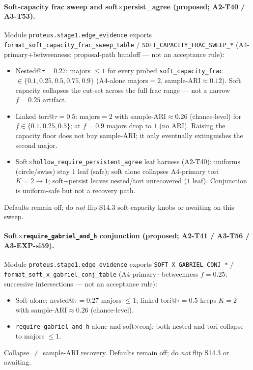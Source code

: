 \documentclass[11pt]{article}
\begin{document}
\paragraph{Soft-capacity frac sweep and soft$\times$persist\_agree (proposed;
A2-T40 / A3-T53).}
Module \texttt{proteus.stage1.edge\_evidence} exports
\texttt{format\_soft\_capacity\_frac\_sweep\_table} /
\texttt{SOFT\_CAPACITY\_FRAC\_SWEEP\_*} (A4-primary$+$betweenness; proposal-path
handoff --- not an acceptance rule):
\begin{itemize}[leftmargin=1.5em]
  \item Nested@$\tau{=}0.27$: majors $\le 1$ for every probed
  \texttt{soft\_capacity\_frac}${}\in\{0.1,0.25,0.5,0.75,0.9\}$ (A4-alone
  majors${=}2$, sample-ARI$\approx 0.12$). Soft capacity collapses the
  cut-set across the full frac range --- not a narrow $f{=}0.25$ artifact.
  \item Linked tori@$\tau{=}0.5$: majors${=}2$ with sample-ARI$\approx 0.26$
  (chance-level) for $f\in\{0.1,0.25,0.5\}$; at $f{=}0.9$ majors drop to
  $1$ (no ARI). Raising the capacity floor does not buy sample-ARI; it only
  eventually extinguishes the second major.
  \item Soft$\times$\texttt{hollow\_require\_persistent\_agree} leaf harness
  (A2-T40): uniforms (circle/swiss) stay $1$ leaf (safe); soft alone collapses
  A4-primary tori $K{=}2\!\to\!1$; soft$+$persist leaves nested/tori
  unrecovered ($1$ leaf). Conjunction is uniform-safe but not a recovery path.
\end{itemize}
Defaults remain off; do \emph{not} flip S14.3 soft-capacity knobs or awaiting
on this sweep.

\paragraph{Soft$\times$\texttt{require\_gabriel\_and\_h} conjunction (proposed;
A2-T41 / A3-T56 / A3-EXP-si59).}
Module \texttt{proteus.stage1.edge\_evidence} exports
\texttt{SOFT\_X\_GABRIEL\_CONJ\_*} /
\texttt{format\_soft\_x\_gabriel\_conj\_table} (A4-primary$+$betweenness
$f{=}0.25$; successive intersections --- not an acceptance rule):
\begin{itemize}[leftmargin=1.5em]
  \item Soft alone: nested@$\tau{=}0.27$ majors $\le 1$; linked tori@$\tau{=}0.5$
  keeps $K{=}2$ with sample-ARI$\approx 0.26$ (chance-level).
  \item \texttt{require\_gabriel\_and\_h} alone and soft$\times$conj: both nested
  and tori collapse to majors $\le 1$.
\end{itemize}
Collapse $\neq$ sample-ARI recovery. Defaults remain off; do \emph{not} flip
S14.3 or awaiting.
\end{document}
